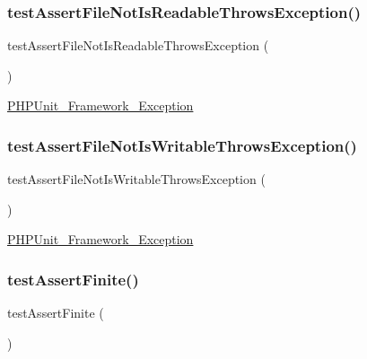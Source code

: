 \subsubsection{\texorpdfstring{test\+Assert\+File\+Not\+Is\+Readable\+Throws\+Exception()}{testAssertFileNotIsReadableThrowsException()}}
{\footnotesize\ttfamily test\+Assert\+File\+Not\+Is\+Readable\+Throws\+Exception (\begin{DoxyParamCaption}{ }\end{DoxyParamCaption})}

\mbox{\hyperlink{class_p_h_p_unit___framework___exception}{P\+H\+P\+Unit\+\_\+\+Framework\+\_\+\+Exception}} \mbox{\label{class_framework___assert_test_a0365edf1603e6cef55737ad7ca2eda04}} 
\subsubsection{\texorpdfstring{test\+Assert\+File\+Not\+Is\+Writable\+Throws\+Exception()}{testAssertFileNotIsWritableThrowsException()}}
{\footnotesize\ttfamily test\+Assert\+File\+Not\+Is\+Writable\+Throws\+Exception (\begin{DoxyParamCaption}{ }\end{DoxyParamCaption})}

\mbox{\hyperlink{class_p_h_p_unit___framework___exception}{P\+H\+P\+Unit\+\_\+\+Framework\+\_\+\+Exception}} \mbox{\label{class_framework___assert_test_a72e4c62df2429b38881fe1e0fb4d6eba}} 
\subsubsection{\texorpdfstring{test\+Assert\+Finite()}{testAssertFinite()}}
{\footnotesize\ttfamily test\+Assert\+Finite (\begin{DoxyParamCaption}{ }\end{DoxyParamCaption})}

